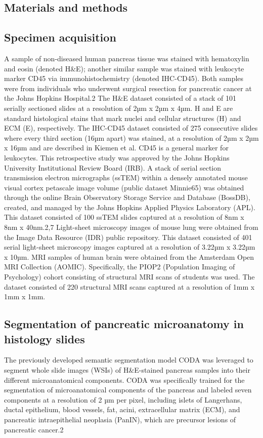 \begin{refsection}
    \section{Materials and methods}
    \subsection{Specimen acquisition}
    A sample of non-diseased human pancreas tissue was stained with hematoxylin and eosin (denoted H\&E); another similar sample was stained with leukocyte marker CD45 via immunohistochemistry (denoted IHC-CD45). Both samples were from individuals who underwent surgical resection for pancreatic cancer at the Johns Hopkins Hospital.2 The H\&E dataset consisted of a stack of 101 serially sectioned slides at a resolution of 2µm x 2µm x 4µm. H and E are standard histological stains that mark nuclei and cellular structures (H) and ECM (E), respectively. The IHC-CD45 dataset consisted of 275 consecutive slides where every third section (16µm apart) was stained, at a resolution of 2µm x 2µm x 16µm and are described in Kiemen et al.\cite{kiemen2024a} CD45 is a general marker for leukocytes. This retrospective study was approved by the Johns Hopkins University Institutional Review Board (IRB).
    A stack of serial section transmission electron micrographs (ssTEM) within a densely annotated mouse visual cortex petascale image volume (public dataset Minnie65) was obtained through the online Brain Observatory Storage Service and Database (BossDB), created, and managed by the Johns Hopkins Applied Physics Laboratory (APL). This dataset consisted of 100 ssTEM slides captured at a resolution of 8nm x 8nm x 40nm.2,7
    Light-sheet microscopy images of mouse lung were obtained from the Image Data Resource (IDR) public repository.\cite{williams2017a,kubota2021a} This dataset consisted of 401 serial light-sheet microscopy images captured at a resolution of 3.22µm x 3.22µm x 10µm.
    MRI samples of human brain were obtained from the Amsterdam Open MRI Collection (AOMIC)\cite{snoek2021a}. Specifically, the PIOP2 (Population Imaging of Psychology) cohort consisting of structural MRI scans of students was used. The dataset consisted of 220 structural MRI scans captured at a resolution of 1mm x 1mm x 1mm. 
    
    \subsection{Segmentation of pancreatic microanatomy in histology slides}
    The previously developed semantic segmentation model CODA was leveraged to segment whole slide images (WSIs) of H\&E-stained pancreas samples into their different microanatomical components\cite{kiemen2022a,Crawford2024Combined,Braxton20243D}. CODA was specifically trained for the segmentation of microanatomical components of the pancreas and labeled seven components at a resolution of 2 µm per pixel, including islets of Langerhans, ductal epithelium, blood vessels, fat, acini, extracellular matrix (ECM), and pancreatic intraepithelial neoplasia (PanIN), which are precursor lesions of pancreatic cancer.2
    

\end{refsection}
